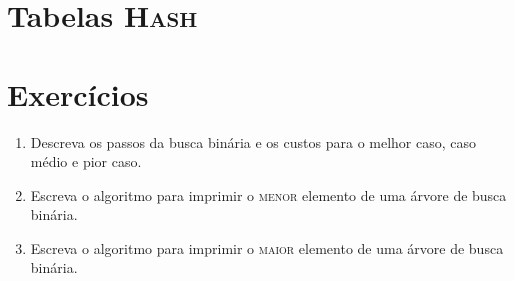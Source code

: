 
%

\section{Tabelas \textsc{Hash}}


\section{Exercícios}

\begin{enumerate}
\item Descreva os passos da busca binária e os custos para o melhor caso, caso médio
e pior caso.

\item Escreva o algoritmo para imprimir o \textsc{menor} elemento de uma árvore de busca binária.
\item Escreva o algoritmo para imprimir o \textsc{maior} elemento de uma árvore de busca binária.
\end{enumerate}
